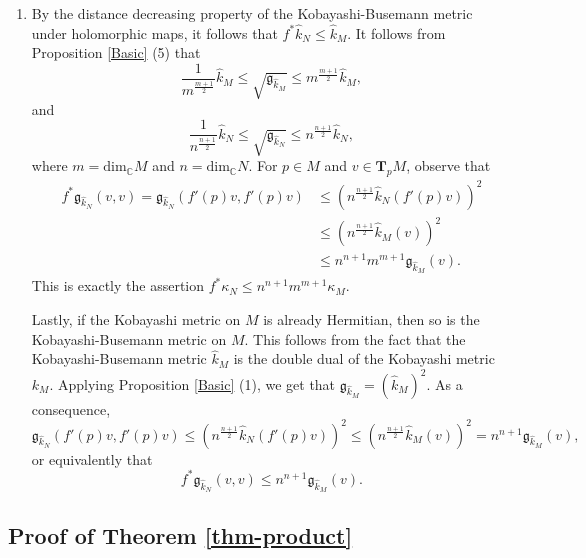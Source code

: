 \documentclass[a4paper,11pt,reqno]{amsart}
\theoremstyle{plain}
\theoremstyle{definition}
\theoremstyle{remark}
\theoremstyle{remark}
\numberwithin{equation}{section}
\newcommand{\g}{\mathfrak{g}}
\begin{document}
\begin{enumerate} [wide]
\item %
By the distance decreasing property of the Kobayashi-Busemann metric under holomorphic maps, it follows that $ f^* \hat{k}_N \leq \hat{k}_M $. 
It follows from Proposition \ref{Basic} (5) that 
\[
\frac{1}{m^{\frac{m+1}{2}}} \hat{k}_M \leq \sqrt{\g_{\hat{k}_M}} \leq {m^{\frac{m+1}{2}}}{\hat{k}_M},  
\]
and 
\[
\frac{1}{n^{\frac{n+1}{2}}} \hat{k}_N \leq \sqrt{\g_{\hat{k}_N}} \leq {n^{\frac{n+1}{2}}}{\hat{k}_N},  
\]
where $ m = \mbox{dim}_{\mathbb{C}} M $ and $ n = \mbox{dim}_{\mathbb{C}} N $. For $ p \in M $ and $ v \in \textbf{T}_p M $,
observe that 
\begin{align*}
    f^* \g_{\hat{k}_N}  (v,v) 
    =  \g_{\hat{k}_N}  \left( f'(p)v, f'(p) v \right) 
    & \leq  \left( n^{\frac{n+1}{2}} {\hat{k}_N} \left( f'(p)v \right) \right)^2 \\
    & \leq \left( n^{\frac{n+1}{2}} {\hat{k}_M} ( v) \right)^2 \\
    & \leq  n^{n+1} m^{m+1} \g_{\hat{k}_M}( v).      
\end{align*}
This is exactly the assertion $ f^* \kappa_N \leq  n^{n+1} m^{m+1} \kappa_M $.

Lastly, if the Kobayashi metric on $ M$ is already Hermitian, then so is the Kobayashi-Busemann metric on $ M$. This follows from the fact that the Kobayashi-Busemann metric $ \hat{k}_M $ is the double dual of the Kobayashi metric $ k_M $. Applying Proposition \ref{Basic} (1), we get that $ \g_{\hat{k}_M} = ( \hat{k}_M )^2 $. As a consequence,
\[
 \g_{\hat{k}_N}  \left( f'(p)v, f'(p) v \right) \leq  \left( n^{\frac{n+1}{2}} {\hat{k}_N} \left( f'(p)v \right) \right)^2 \leq \left( n^{\frac{n+1}{2}} {\hat{k}_M} ( v) \right)^2  = n^{n+1} \mathfrak{g}_{\hat{k}_M}(v),
\]
or equivalently that
\[
f^* \g_{\hat{k}_N}  (v,v) \leq n^{n+1} \mathfrak{g}_{\hat{k}_M}(v).
\]
 \end{enumerate}

\subsection{Proof of Theorem \ref{thm-product}}
    
\end{document}
